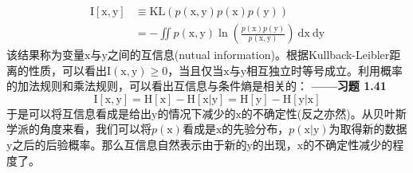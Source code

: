 \documentclass[b5paper]{book}
\numberwithin{equation}{chapter}
\begin{document}
{\begin{equation}
		\begin{split}
			\mathrm{I}[\boldsymbol{\mathrm{x}},\boldsymbol{\mathrm{y}}] &\equiv \mathrm{KL}(p(\boldsymbol{\mathrm{x}},\boldsymbol{\mathrm{y}})p(\boldsymbol{\mathrm{x}})p(\boldsymbol{\mathrm{y}}))\\
			&=-\iint p(\boldsymbol{\mathrm{x}},\boldsymbol{\mathrm{y}}) \ln \left(\frac{p(\boldsymbol{\mathrm{x}})p(\boldsymbol{\mathrm{y}})}{p(\boldsymbol{\mathrm{x}},\boldsymbol{\mathrm{y}})}\right)\ \mathrm{d}\boldsymbol{\mathrm{x}}\ \mathrm{d}\boldsymbol{\mathrm{y}}
		\end{split}
	\end{equation}
	该结果称为变量$\boldsymbol{\mathrm{x}}$与$\boldsymbol{\mathrm{y}}$之间的互信息(nutual information)。根据Kullback-Leibler距离的性质，可以看出$\mathrm{I}(\boldsymbol{\mathrm{x}},\boldsymbol{\mathrm{y}}) \geqslant 0$，当且仅当$\boldsymbol{\mathrm{x}}$与$\boldsymbol{\mathrm{y}}$相互独立时等号成立。利用概率的加法规则和乘法规则，可以看出互信息与条件熵是相关的：\color{red} \textbf{——习题 1.41} \color{black}
	\begin{equation}
		\mathrm{I}[\boldsymbol{\mathrm{x}},\boldsymbol{\mathrm{y}}]=\mathrm{H}[\boldsymbol{\mathrm{x}}]-\mathrm{H}[\boldsymbol{\mathrm{x}}|\boldsymbol{\mathrm{y}}]=\mathrm{H}[\boldsymbol{\mathrm{y}}]-\mathrm{H}[\boldsymbol{\mathrm{y}}|\boldsymbol{\mathrm{x}}]
	\end{equation}
	于是可以将互信息看成是给出$\boldsymbol{\mathrm{y}}$的情况下减少的$\boldsymbol{\mathrm{x}}$的不确定性(反之亦然)。从贝叶斯学派的角度来看，我们可以将$p(\boldsymbol{\mathrm{x}})$看成是$\boldsymbol{\mathrm{x}}$的先验分布，$p(\boldsymbol{\mathrm{x}}|\boldsymbol{\mathrm{y}})$为取得新的数据$\boldsymbol{\mathrm{y}}$之后的后验概率。那么互信息自然表示由于新的$\boldsymbol{\mathrm{y}}$的出现，$\boldsymbol{\mathrm{x}}$的不确定性减少的程度了。
	}
\end{document}
